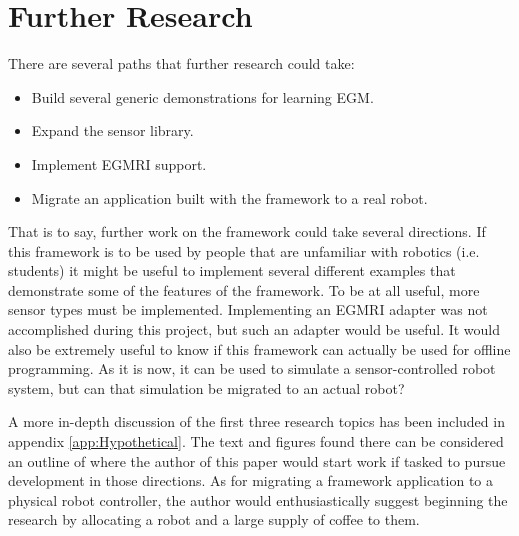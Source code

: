 \documentclass{cslthse-msc}
\begin{document}
\section{Further Research}
\label{sec:Anal_Con:Fur_Res}
There are several paths that further research could take:
\begin{itemize}
    \item Build several generic demonstrations for learning EGM.
    \item Expand the sensor library.
    \item Implement EGMRI support.
    \item Migrate an application built with the framework to a real robot. 
\end{itemize}
That is to say, further work on the framework could take several directions. If this framework is to be used by people that are unfamiliar with robotics (i.e. students) it might be useful to implement several different examples that demonstrate some of the features of the framework. To be at all useful, more sensor types must be implemented. Implementing an EGMRI adapter was not accomplished during this project, but such an adapter would be useful. It would also be extremely useful to know if this framework can actually be used for offline programming. As it is now, it can be used to simulate a sensor-controlled robot system, but can that simulation be migrated to an actual robot?\par

A more in-depth discussion of the first three research topics has been included in appendix \ref{app:Hypothetical}. The text and figures found there can be considered an outline of where the author of this paper would start work if tasked to pursue development in those directions. As for migrating a framework application to a physical robot controller, the author would enthusiastically suggest beginning the research by allocating a robot and a large supply of coffee to them. 
\end{document}
